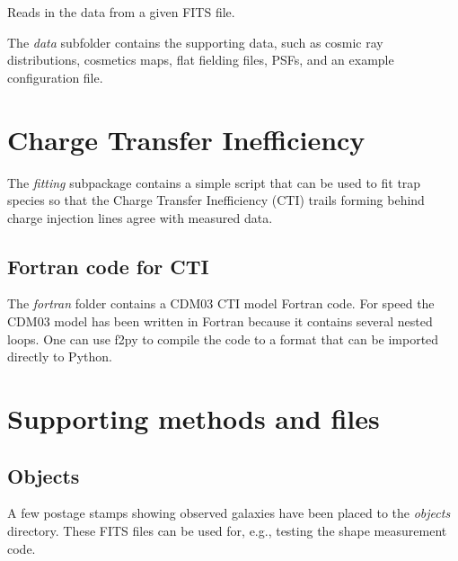 \documentclass[a4paper,12pt,english]{sphinxmanual}
\begin{document}

\begin{fulllineitems}
\label{analysis:analysis.PSFproperties.plotEncircledEnergy}
\end{fulllineitems}


\begin{fulllineitems}
\label{analysis:analysis.PSFproperties.readData}
Reads in the data from a given FITS file.

\end{fulllineitems}


The \emph{data} subfolder contains the supporting data, such as cosmic ray distributions, cosmetics maps,
flat fielding files, PSFs, and an example configuration file.


\chapter{Charge Transfer Inefficiency}
\label{index:charge-transfer-inefficiency}
The \emph{fitting} subpackage contains a simple script that can be used to fit trap species so that the
Charge Transfer Inefficiency (CTI) trails forming behind charge injection lines agree with measured data.


\section{Fortran code for CTI}
\label{index:fortran-code-for-cti}
The \emph{fortran} folder contains a CDM03 CTI model Fortran code. For speed the CDM03 model has been written in Fortran
because it contains several nested loops. One can use f2py to compile the code to a format that can be imported
directly to Python.


\chapter{Supporting methods and files}
\label{index:supporting-methods-and-files}

\section{Objects}
\label{index:objects}
A few postage stamps showing observed galaxies have been placed to the \emph{objects} directory. These FITS files
can be used for, e.g., testing the shape measurement code.
\end{document}
